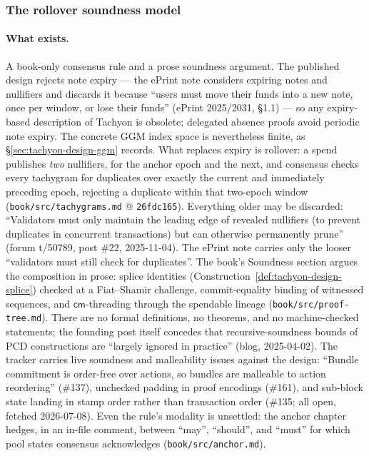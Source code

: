 \documentclass[11pt,a4paper]{article}
\theoremstyle{definition}
\newcommand{\cmsym}{\mathsf{cm}}
\begin{document}
\subsubsection{The rollover soundness model}\label{sec:tachyon-dbu-rollover}

\paragraph{What exists.} A book-only consensus rule and a prose soundness
argument. The published design rejects note expiry --- the ePrint note
considers expiring notes and nullifiers and discards it because ``users must
move their funds into a new note, once per window, or lose their funds''
(ePrint 2025/2031, \S1.1) --- so any expiry-based description of Tachyon is
obsolete; delegated absence proofs avoid periodic note expiry. The
concrete GGM index space is nevertheless finite, as
\S\ref{sec:tachyon-design-ggm} records.
What replaces expiry is rollover: a spend publishes \emph{two} nullifiers,
for the anchor epoch and the next, and consensus checks every tachygram for
duplicates over exactly the current and immediately preceding epoch,
rejecting a duplicate within that two-epoch window
(\texttt{book/src/tachygrams.md} @ \texttt{26fdc165}). Everything older may
be discarded: ``Validators must only maintain the leading edge of revealed
nullifiers (to prevent duplicates in concurrent transactions) but can
otherwise permanently prune'' (forum t/50789, post \#22, 2025-11-04). The
ePrint note carries only the looser ``validators must still check for
duplicates''. The book's Soundness section argues the composition in prose:
splice identities (Construction~\ref{def:tachyon-design-splice})
checked at a Fiat--Shamir challenge, commit-equality binding of witnessed
sequences, and $\cmsym$-threading through the spendable lineage
(\texttt{book/src/proof-tree.md}). There are no formal definitions, no
theorems, and no machine-checked statements; the founding post itself
concedes that recursive-soundness bounds of PCD constructions are ``largely
ignored in practice'' (blog, 2025-04-02). The tracker carries live soundness
and malleability issues against the design: ``Bundle commitment is
order-free over actions, so bundles are malleable to action reordering''
(\#137), unchecked padding in proof encodings (\#161), and sub-block state
landing in stamp order rather than transaction order (\#135; all open,
fetched 2026-07-08). Even the rule's modality is unsettled: the
anchor chapter hedges, in an in-file comment, between ``may'', ``should'',
and ``must'' for which pool states consensus acknowledges
(\texttt{book/src/anchor.md}).
\end{document}
